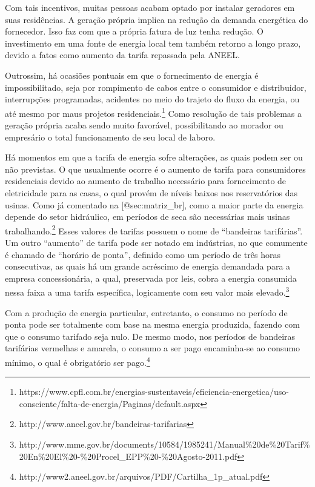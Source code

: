 \documentclass[
]{article}
\begin{document}
Com tais incentivos, muitas pessoas acabam optado por instalar geradores
em suas residências. A geração própria implica na redução da demanda
energética do fornecedor. Isso faz com que a própria fatura de luz tenha
redução. O investimento em uma fonte de energia local tem também retorno
a longo prazo, devido a fatos como aumento da tarifa repassada pela
ANEEL.

Outrossim, há ocasiões pontuais em que o fornecimento de energia é
impossibilitado, seja por rompimento de cabos entre o consumidor e
distribuidor, interrupções programadas, acidentes no meio do trajeto do
fluxo da energia, ou até mesmo por maus projetos residenciais.\footnote{https://www.cpfl.com.br/energias-sustentaveis/eficiencia-energetica/uso-consciente/falta-de-energia/Paginas/default.aspx}
Como resolução de tais problemas a geração própria acaba sendo muito
favorável, possibilitando ao morador ou empresário o total funcionamento
de seu local de laboro.

Há momentos em que a tarifa de energia sofre alterações, as quais podem
ser ou não previstas. O que usualmente ocorre é o aumento de tarifa para
consumidores residenciais devido ao aumento de trabalho necessário para
fornecimento de eletricidade para as casas, o qual provém de níveis
baixos nos reservatórios das usinas. Como já comentado na
{[}@sec:matriz\_br{]}, como a maior parte da energia depende do setor
hidráulico, em períodos de seca são necessárias mais usinas
trabalhando.\footnote{http://www.aneel.gov.br/bandeiras-tarifarias}
Esses valores de tarifas possuem o nome de ``bandeiras tarifárias''. Um
outro ``aumento'' de tarifa pode ser notado em indústrias, no que
comumente é chamado de ``horário de ponta'', definido como um período de
três horas consecutivas, as quais há um grande acréscimo de energia
demandada para a empresa concessionária, a qual, preservada por leis,
cobra a energia consumida nessa faixa a uma tarifa específica,
logicamente com seu valor mais elevado.\footnote{http://www.mme.gov.br/documents/10584/1985241/Manual\%20de\%20Tarif\%20En\%20El\%20-\%20Procel\_EPP\%20-\%20Agosto-2011.pdf}

Com a produção de energia particular, entretanto, o consumo no período
de ponta pode ser totalmente com base na mesma energia produzida,
fazendo com que o consumo tarifado seja nulo. De mesmo modo, nos
períodos de bandeiras tarifárias vermelhas e amarela, o consumo a ser
pago encaminha-se ao consumo mínimo, o qual é obrigatório ser
pago.\footnote{http://www2.aneel.gov.br/arquivos/PDF/Cartilha\_1p\_atual.pdf}
\end{document}
